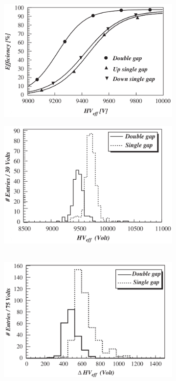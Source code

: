 	\begin{figure}[H]
		\begin{subfigure}{\linewidth}
			\centering
			\includegraphics[width = 0.65\linewidth]{fig/chapt3/Double-gap-Sigmoid.png}
			\caption{\label{fig:DoubleGap:A}}
		\end{subfigure}
		\begin{subfigure}{0.5\linewidth}
			\centering
			\includegraphics[width = \linewidth]{fig/chapt3/Double-gap-Eff-95.png}
			\caption{\label{fig:DoubleGap:B}}
		\end{subfigure}
		\begin{subfigure}{0.5\linewidth}
			\centering\
			\includegraphics[width = \linewidth]{fig/chapt3/Double-gap-Eff-Delta-90-10.png}

\end{subfigure}
\end{figure}
